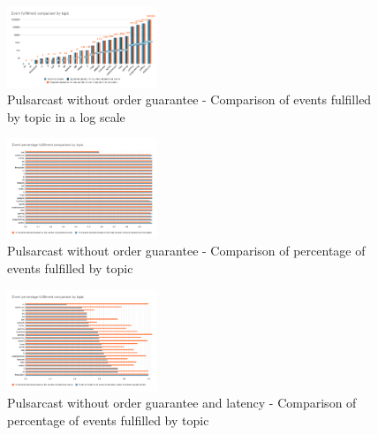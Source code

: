 \begin{figure}[!htb]
  \centering
  \includegraphics[width=0.4\textwidth]{../images/graph-pulsarcast-event-fulfillment-comparison.png}
  \caption{Pulsarcast without order guarantee - Comparison of events fulfilled by topic in a log scale}
  \label{fig:graph-pulsarcast-event-fulfillment-comparison}
\end{figure}

\begin{figure}[!htb]
  \centering
  \includegraphics[width=0.4\textwidth]{../images/graph-pulsarcast-event-percentage-fulfillment-comparison.png}
  \caption{Pulsarcast without order guarantee - Comparison of percentage of events fulfilled by topic}
  \label{fig:graph-pulsarcast-event-percentage-fulfillment-comparison}
\end{figure}

\begin{figure}[!htb]
  \centering
  \includegraphics[width=0.4\textwidth]{../images/graph-pulsarcast-latency-event-percentage-fulfillment-comparison.png}
  \caption{Pulsarcast without order guarantee and latency - Comparison of percentage of events fulfilled by topic}
  \label{fig:graph-pulsarcast-latency-event-percentage-fulfillment-comparison}
\end{figure}

